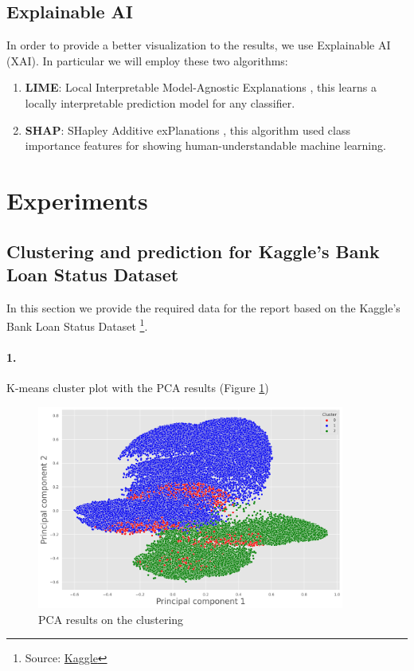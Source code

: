 \documentclass[12pt]{article}
\begin{document}
\subsection{Explainable AI}
In order to provide a better visualization to the results, we use Explainable AI (XAI). In particular we will employ these two algorithms:
\begin{enumerate}
    \item \textbf{LIME}: Local Interpretable Model-Agnostic Explanations \cite{DBLP:journals/corr/RibeiroSG16} , this learns a locally interpretable prediction model for any classifier.
    \item \textbf{SHAP}: SHapley Additive exPlanations \cite{DBLP:journals/corr/LundbergL17}, this algorithm used class importance features for showing human-understandable machine learning.
\end{enumerate}



\section{Experiments}

\subsection{Clustering and prediction for Kaggle's Bank Loan Status Dataset}
In this section we provide the required data for the report based on the Kaggle's Bank Loan Status Dataset \footnote{Source: \href{https://www.kaggle.com/zaurbegiev/my-dataset}{Kaggle}}.

\paragraph{1.} K-means cluster plot with the PCA results (Figure \ref{fig:pca_kaggle})

\begin{figure}[h!]
    \centering
    \includegraphics[width=0.9\textwidth]{images/pca_results_kaggle.jpg}
    \caption{PCA results on the clustering}
    \label{fig:pca_kaggle}
\end{figure}
\end{document}
